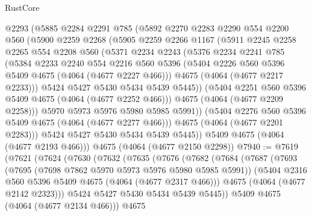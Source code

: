 \begin{lexlean}{RustCore}
\begin{coremodule}
        @2293
        (@5885
          @2284
          @2291
          @785
          (@5892
            @2270
            @2283
            @2290
            @554
            @2200
            @560
            (@5900
              @2259
              @2268
              (@5905
                @2259
                @2266
                @1167
                (@5911
                  @2245
                  @2258
                  @2265
                  @554
                  @2208
                  @560
                  (@5371
                    @2234
                    @2243
                    (@5376
                      @2234
                      @2241
                      @785
                      (@5384
                        @2233
                        @2240
                        @554
                        @2216
                        @560
                        @5396
                        (@5404 @2226 @560 @5396 @5409 @4675 (@4064 (@4677 @2227 @466)))
                        @4675
                        (@4064 (@4677 @2217 @2233)))
                      @5424
                      @5427
                      @5430
                      @5434
                      @5439
                      @5445))
                  (@5404 @2251 @560 @5396 @5409 @4675 (@4064 (@4677 @2252 @466)))
                  @4675
                  (@4064 (@4677 @2209 @2258)))
                @5970
                @5973
                @5976
                @5980
                @5985
                @5991))
            (@5404 @2276 @560 @5396 @5409 @4675 (@4064 (@4677 @2277 @466)))
            @4675
            (@4064 (@4677 @2201 @2283)))
          @5424
          @5427
          @5430
          @5434
          @5439
          @5445))
      @5409
      @4675
      (@4064 (@4677 @2193 @466)))
    @4675
    (@4064 (@4677 @2150 @2298))
@7940 := @7619
    (@7621
      (@7624
        (@7630
          (@7632
            (@7635
              (@7676
                (@7682
                  (@7684
                    (@7687
                      (@7693
                        (@7695 (@7698 @7862 @5970 @5973 @5976 @5980 @5985 @5991))
                        (@5404 @2316 @560 @5396 @5409 @4675 (@4064 (@4677 @2317 @466)))
                        @4675
                        (@4064 (@4677 @2142 @2323)))
                      @5424
                      @5427
                      @5430
                      @5434
                      @5439
                      @5445))
                  @5409
                  @4675
                  (@4064 (@4677 @2134 @466)))
                @4675

\end{coremodule}
\end{lexlean}
